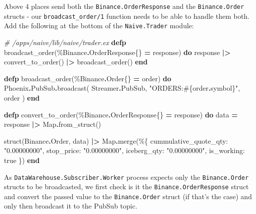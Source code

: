 \documentclass[
]{book}
\newenvironment{Shaded}{\begin{snugshade}}{\end{snugshade}}
\newcommand{\CommentTok}[1]{\textcolor[rgb]{0.56,0.35,0.01}{\textit{#1}}}
\newcommand{\ConstantTok}[1]{\textcolor[rgb]{0.00,0.00,0.00}{#1}}
\newcommand{\KeywordTok}[1]{\textcolor[rgb]{0.13,0.29,0.53}{\textbf{#1}}}
\newcommand{\NormalTok}[1]{#1}
\newcommand{\OperatorTok}[1]{\textcolor[rgb]{0.81,0.36,0.00}{\textbf{#1}}}
\newcommand{\OtherTok}[1]{\textcolor[rgb]{0.56,0.35,0.01}{#1}}
\newcommand{\StringTok}[1]{\textcolor[rgb]{0.31,0.60,0.02}{#1}}
\newcommand{\VariableTok}[1]{\textcolor[rgb]{0.00,0.00,0.00}{#1}}
\begin{document}
Above 4 places send both the \texttt{Binance.OrderResponse} and the \texttt{Binance.Order} structs - our \texttt{broadcast\_order/1} function needs to be able to handle them both. Add the following at the bottom of the \texttt{Naive.Trader} module:

\begin{Shaded}
\begin{Highlighting}[]
  \CommentTok{\# /apps/naive/lib/naive/trader.ex}
  \KeywordTok{defp}\NormalTok{ broadcast\_order(\%}\ConstantTok{Binance}\OperatorTok{.}\ConstantTok{OrderResponse}\NormalTok{\{\} }\OperatorTok{=}\NormalTok{ response) }\KeywordTok{do}
\NormalTok{    response}
    \OperatorTok{|\textgreater{}}\NormalTok{ convert\_to\_order()}
    \OperatorTok{|\textgreater{}}\NormalTok{ broadcast\_order()}
  \KeywordTok{end}

  \KeywordTok{defp}\NormalTok{ broadcast\_order(\%}\ConstantTok{Binance}\OperatorTok{.}\ConstantTok{Order}\NormalTok{\{\} }\OperatorTok{=}\NormalTok{ order) }\KeywordTok{do}
    \ConstantTok{Phoenix}\OperatorTok{.}\ConstantTok{PubSub}\OperatorTok{.}\NormalTok{broadcast(}
      \ConstantTok{Streamer}\OperatorTok{.}\ConstantTok{PubSub}\NormalTok{,}
      \StringTok{"ORDERS:}\OtherTok{\#\{}\NormalTok{order}\OperatorTok{.}\NormalTok{symbol}\OtherTok{\}}\StringTok{"}\NormalTok{,}
\NormalTok{      order}
\NormalTok{    )}
  \KeywordTok{end}

  \KeywordTok{defp}\NormalTok{ convert\_to\_order(\%}\ConstantTok{Binance}\OperatorTok{.}\ConstantTok{OrderResponse}\NormalTok{\{\} }\OperatorTok{=}\NormalTok{ response) }\KeywordTok{do}
\NormalTok{    data }\OperatorTok{=}
\NormalTok{      response}
      \OperatorTok{|\textgreater{}} \ConstantTok{Map}\OperatorTok{.}\NormalTok{from\_struct()}

\NormalTok{    struct(}\ConstantTok{Binance}\OperatorTok{.}\ConstantTok{Order}\NormalTok{, data)}
    \OperatorTok{|\textgreater{}} \ConstantTok{Map}\OperatorTok{.}\NormalTok{merge(\%\{}
      \VariableTok{cummulative\_quote\_qty:} \StringTok{"0.00000000"}\NormalTok{,}
      \VariableTok{stop\_price:} \StringTok{"0.00000000"}\NormalTok{,}
      \VariableTok{iceberg\_qty:} \StringTok{"0.00000000"}\NormalTok{,}
      \VariableTok{is\_working:} \ConstantTok{true}
\NormalTok{    \})}
  \KeywordTok{end}
\end{Highlighting}
\end{Shaded}

As \texttt{DataWarehouse.Subscriber.Worker} process expects only the \texttt{Binance.Order} structs to be broadcasted, we first check is it the \texttt{Binance.OrderResponse} struct and convert the passed value to the \texttt{Binance.Order} struct (if that's the case) and only then broadcast it to the PubSub topic.
\end{document}
